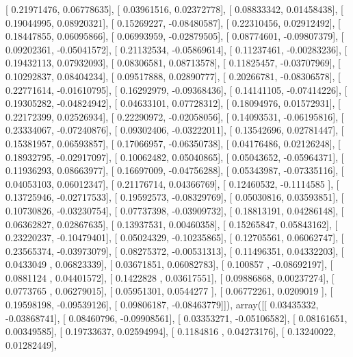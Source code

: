 \documentclass{article}
\begin{document}
       [ 0.21971476,  0.06778635],
       [ 0.03961516,  0.02372778],
       [ 0.08833342,  0.01458438],
       [ 0.19044995,  0.08920321],
       [ 0.15269227, -0.08480587],
       [ 0.22310456,  0.02912492],
       [ 0.18447855,  0.06095866],
       [ 0.06993959, -0.02879505],
       [ 0.08774601, -0.09807379],
       [ 0.09202361, -0.05041572],
       [ 0.21132534, -0.05869614],
       [ 0.11237461, -0.00283236],
       [ 0.19432113,  0.07932093],
       [ 0.08306581,  0.08713578],
       [ 0.11825457, -0.03707969],
       [ 0.10292837,  0.08404234],
       [ 0.09517888,  0.02890777],
       [ 0.20266781, -0.08306578],
       [ 0.22771614, -0.01610795],
       [ 0.16292979, -0.09368436],
       [ 0.14141105, -0.07414226],
       [ 0.19305282, -0.04824942],
       [ 0.04633101,  0.07728312],
       [ 0.18094976,  0.01572931],
       [ 0.22172399,  0.02526934],
       [ 0.22290972, -0.02058056],
       [ 0.14093531, -0.06195816],
       [ 0.23334067, -0.07240876],
       [ 0.09302406, -0.03222011],
       [ 0.13542696,  0.02781447],
       [ 0.15381957,  0.06593857],
       [ 0.17066957, -0.06350738],
       [ 0.04176486,  0.02126248],
       [ 0.18932795, -0.02917097],
       [ 0.10062482,  0.05040865],
       [ 0.05043652, -0.05964371],
       [ 0.11936293,  0.08663977],
       [ 0.16697009, -0.04756288],
       [ 0.05343987, -0.07335116],
       [ 0.04053103,  0.06012347],
       [ 0.21176714,  0.04366769],
       [ 0.12460532, -0.1114585 ],
       [ 0.13725946, -0.02717533],
       [ 0.19592573, -0.08329769],
       [ 0.05030816,  0.03593851],
       [ 0.10730826, -0.03230754],
       [ 0.07737398, -0.03909732],
       [ 0.18813191,  0.04286148],
       [ 0.06362827,  0.02867635],
       [ 0.13937531,  0.00460358],
       [ 0.15265847,  0.05843162],
       [ 0.23220237, -0.10479401],
       [ 0.05024329, -0.10235865],
       [ 0.12705561,  0.06062747],
       [ 0.23565374, -0.03973079],
       [ 0.08275372, -0.00531313],
       [ 0.11496351,  0.04332203],
       [ 0.0433049 ,  0.06823339],
       [ 0.03671851,  0.06082783],
       [ 0.100857  , -0.08692197],
       [ 0.0881124 ,  0.04401572],
       [ 0.1422828 ,  0.03617551],
       [ 0.09886868,  0.00237274],
       [ 0.0773765 ,  0.06279015],
       [ 0.05951301,  0.0544277 ],
       [ 0.06772261,  0.0209019 ],
       [ 0.19598198, -0.09539126],
       [ 0.09806187, -0.08463779]]), array([[ 0.03435332, -0.03868741],
       [ 0.08460796, -0.09908561],
       [ 0.03353271, -0.05106582],
       [ 0.08161651,  0.00349585],
       [ 0.19733637,  0.02594994],
       [ 0.1184816 ,  0.04273176],
       [ 0.13240022,  0.01282449],
\end{document}
